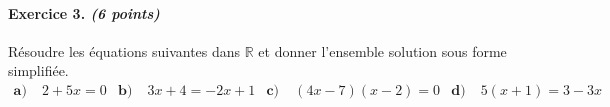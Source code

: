 \documentclass[11pt]{article}
\begin{document}
\paragraph{Exercice 3. \emph{(6 points)}} Résoudre les équations suivantes dans $\mathbb{R}$ et
donner l'ensemble solution sous forme simplifiée.
\begin{align*}
  \textbf{a)}\; & 2+5x = 0 &
  \textbf{b)}\; & 3x+4 = -2x+1 &
  \textbf{c)}\; & (4x-7)(x-2) = 0 &
  \textbf{d)}\; & 5(x+1) = 3-3x &
\end{align*}
\end{document}
